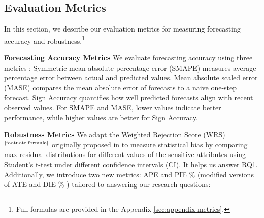 \subsection{Evaluation Metrics}
\label{sec:metrics}

In this section, we describe our evaluation metrics for measuring forecasting accuracy and robustness.\footnote{Full formulas are provided in the Appendix \ref{sec:appendix-metrics}.\label{footnote:formula}}

\noindent \textbf{Forecasting Accuracy Metrics} We evaluate forecasting accuracy using three metrics \cite{makridakis2022m5}: Symmetric mean absolute percentage error (SMAPE) measures average percentage error between actual and predicted values. Mean absolute scaled error (MASE) compares the mean absolute error of forecasts to a naive one-step forecast. Sign Accuracy quantifies how well predicted forecasts align with recent observed values. For SMAPE and MASE, lower values indicate better performance, while higher values are better for Sign Accuracy.

\noindent \textbf{Robustness Metrics} We adapt the Weighted Rejection Score (WRS)$^\text{\ref{footnote:formula}}$ originally proposed in \cite{kausik2024rating} to measure statistical bias by comparing max residual distributions for different values of the sensitive attributes using Student's t-test \cite{student1908probable} under different confidence intervals (CI). It helps us answer RQ1. Additionally, we introduce two new metrics: APE and PIE \% (modified versions of ATE \cite{abdia2017propensity} and DIE \% \cite{kausik2024rating}) tailored to answering our research questions:



